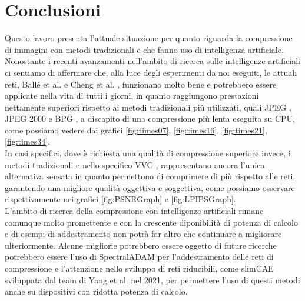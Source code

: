 \chapter{Conclusioni}
Questo lavoro presenta l’attuale situazione per quanto riguarda la compressione di immagini con metodi tradizionali e che fanno uso di intelligenza artificiale. Nonostante i recenti avanzamenti nell’ambito di ricerca sulle intelligenze artificiali ci sentiamo di affermare che, alla luce degli esperimenti da noi eseguiti, le attuali reti, Ballé et al. \cite{minnen2018joint} e Cheng et al. \cite{cheng2020learned}, funzionano molto bene e potrebbero essere applicate nella vita di tutti i giorni, in quanto raggiungono prestazioni nettamente superiori rispetto ai metodi tradizionali più utilizzati, quali JPEG \cite{125072}, JPEG 2000 \cite{952804} e BPG \cite{BPGImageformat}, a discapito di una compressione più lenta eseguita su CPU, come possiamo vedere dai grafici \ref{fig:times07}, \ref{fig:times16}, \ref{fig:times21}, \ref{fig:times34}.\\
In casi specifici, dove è richiesta una qualità di compressione superiore invece, i metodi tradizionali e nello specifico VVC \cite{9503377}, rappresentano ancora l’unica alternativa sensata in quanto permettono di comprimere di più rispetto alle reti, garantendo una migliore qualità oggettiva e soggettiva, come possiamo osservare rispettivamente nei grafici \ref{fig:PSNRGraph} e \ref{fig:LPIPSGraph}.\\
L’ambito di ricerca della compressione con intelligenze artificiali rimane comunque molto promettente e con la crescente diponibilità di potenza di calcolo e di esempi di addestramento non potrà far altro che continuare a migliorare ulteriormente. Alcune migliorie potrebbero essere oggetto di future ricerche potrebbero essere l’uso di SpectralADAM \cite{balle2018efficient} per l’addestramento delle reti di compressione e l’attenzione nello sviluppo di reti riducibili, come slimCAE \cite{yang2021slimmable} sviluppata dal team di Yang et al. nel 2021, per permettere l’uso di questi metodi anche su dispositivi con ridotta potenza di calcolo.\\
